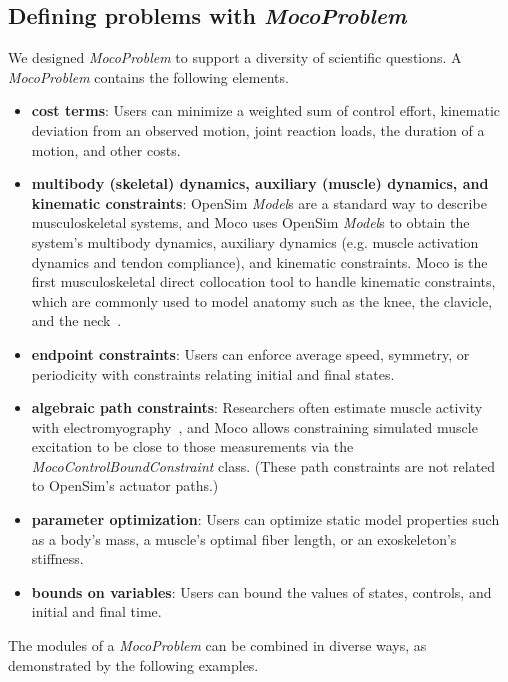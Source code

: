 \documentclass[10pt,letterpaper]{article}
\begin{document}
\subsection*{Defining problems with \textit{MocoProblem}}

We designed \textit{MocoProblem} to support a diversity of scientific questions. A \textit{MocoProblem} contains the following elements.
\begin{itemize}
\item \textbf{cost terms}: Users can minimize a weighted sum of control effort, kinematic deviation from an observed motion, joint reaction loads, the duration of a motion, and other costs.
\item \textbf{multibody (skeletal) dynamics, auxiliary (muscle) dynamics, and kinematic constraints}: OpenSim \textit{Model}s are a standard way to describe musculoskeletal systems, and Moco uses OpenSim \textit{Model}s to obtain the system’s multibody dynamics, auxiliary dynamics (e.g. muscle activation dynamics and tendon compliance), and kinematic constraints. Moco is the first musculoskeletal direct collocation tool to handle kinematic constraints, which are commonly used to model anatomy such as the knee, the clavicle, and the neck~\cite{Seth:2016,Lerner:2015,Rajagopal:2016ek,Cazzola:2017}.
\item \textbf{endpoint constraints}: Users can enforce average speed, symmetry, or periodicity with constraints relating initial and final states.
\item \textbf{algebraic path constraints}: Researchers often estimate muscle activity with electromyography~\cite{Pizzolato:2015,Falisse:2016}, and Moco allows constraining simulated muscle excitation to be close to those measurements via the \textit{MocoControlBoundConstraint} class. (These path constraints are not related to OpenSim’s actuator paths.)
\item \textbf{parameter optimization}: Users can optimize static model properties such as a body’s mass, a muscle’s optimal fiber length, or an exoskeleton’s stiffness.
\item \textbf{bounds on variables}: Users can bound the values of states, controls, and initial and final time.
\end{itemize}
The modules of a \textit{MocoProblem} can be combined in diverse ways, as demonstrated by the following examples.
\end{document}
